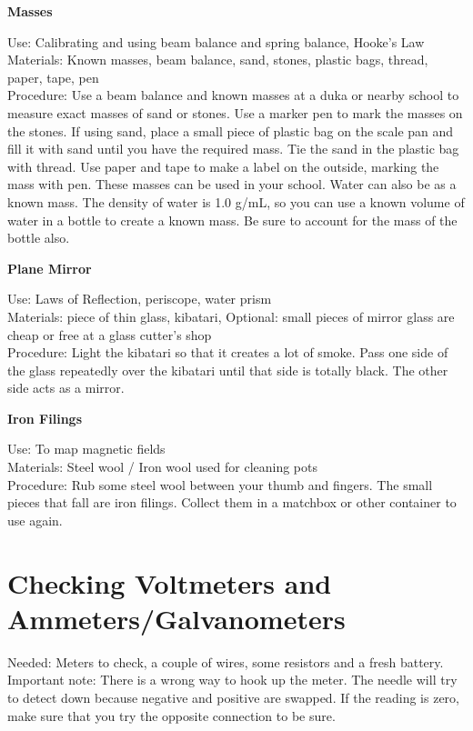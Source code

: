 \begin{flushleft}
\textbf{Masses}
\end{flushleft}
\vspace{-10pt}
Use: Calibrating and using beam balance and spring balance, Hooke's Law\\
Materials: Known masses, beam balance, sand, stones, plastic bags, thread, paper, tape, pen\\
Procedure: Use a beam balance and known masses at a duka or nearby school to measure exact masses of sand or stones.  Use a marker pen to mark the masses on the stones.  If using sand, place a small piece of plastic bag on the scale pan and fill it with sand until you have the required mass.  Tie the sand in the plastic bag with thread.  Use paper and tape to make a label on the outside, marking the mass with pen.  These masses can be used in your school.
Water can also be as a known mass.  The density of water is 1.0 g/mL, so you can use a known volume of water in a bottle to create a known mass.  Be sure to account for the mass of the bottle also.\\

\begin{flushleft}
\textbf{Plane Mirror}
\end{flushleft}
\vspace{-10pt}
Use: Laws of Reflection, periscope, water prism\\
Materials: piece of thin glass, kibatari, Optional: small pieces of mirror glass are cheap or free at a glass cutter's shop\\
Procedure: Light the kibatari so that it creates a lot of smoke.  Pass one side of the glass repeatedly over the kibatari until that side is totally black.  The other side acts as a mirror.\\

\begin{flushleft}
\textbf{Iron Filings}
\end{flushleft}
\vspace{-10pt}
Use: To map magnetic fields\\
Materials: Steel wool / Iron wool used for cleaning pots\\
Procedure: Rub some steel wool between your thumb and fingers.  The small pieces that fall are iron filings.  Collect them in a matchbox or other container to use again.\\

\section{Checking Voltmeters and Ammeters/Galvanometers}
Needed: Meters to check, a couple of wires, some resistors and a fresh battery.  
Important note: There is a wrong way to hook up the meter. The needle will
try to detect down because negative and positive are swapped. If the reading
is zero, make sure that you try the opposite connection to be sure.  
